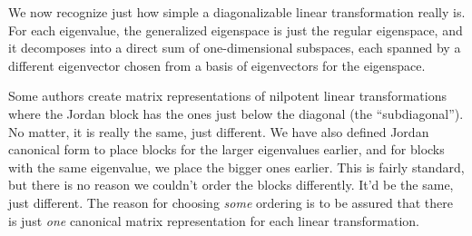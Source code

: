%
We now recognize just how simple a diagonalizable linear transformation really is.  For each eigenvalue, the generalized eigenspace is just the regular eigenspace, and it decomposes into a direct sum of one-dimensional subspaces, each spanned by a different eigenvector chosen from a basis of eigenvectors for the eigenspace.\par
%
Some authors create matrix representations of nilpotent linear transformations where the Jordan block has the ones just below the diagonal (the ``subdiagonal'').  No matter, it is really the same, just different.  We have also defined Jordan canonical form to place blocks for the larger eigenvalues earlier, and for blocks with the same eigenvalue, we place the bigger ones earlier.  This is fairly standard, but there is no reason we couldn't order the blocks differently.  It'd be the same, just different.  The reason for choosing {\em some} ordering is to be assured that there is just {\em one} canonical matrix representation for each linear transformation.
%
